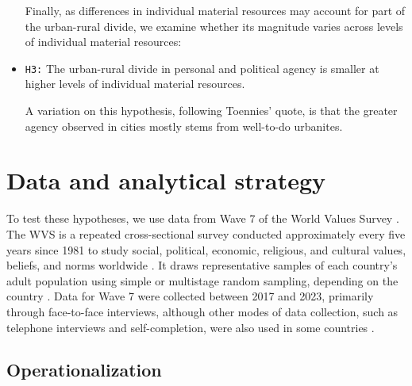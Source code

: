 \documentclass[10pt, letterpaper]{article}
\begin{document}
\begin{spacing}{1.4}
\begin{itemize}
Finally, as differences in individual material resources may account for part of the urban-rural divide, we examine whether its magnitude varies across levels of individual material resources:

\item[] \texttt{H3:} The urban-rural divide in personal and political agency is smaller at higher levels of individual material resources.

A variation on this hypothesis, following Toennies' quote, is that the greater agency observed in cities mostly stems from well-to-do urbanites. 

\end{itemize}


\section{Data and analytical strategy}


To test these hypotheses, we use data from Wave 7 of the World Values Survey \citep{haerpfer2022}. The WVS is a repeated cross-sectional survey conducted approximately every five years since 1981 to study social, political, economic, religious, and cultural values, beliefs, and norms worldwide \citep{WVS2026a,WVS2026b}. It draws representative samples of each country's adult population using simple or multistage random sampling, depending on the country \citep{WVS2026c}. Data for Wave 7 were collected between 2017 and 2023, primarily
through face-to-face interviews, although other modes of data collection, such as telephone interviews and self-completion, were also used in some countries \citep{WVS2026c}.



\subsection{Operationalization}


\end{spacing}
\end{document}
